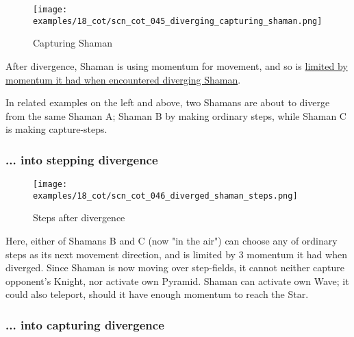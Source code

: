 \noindent
\begin{wrapfigure}[11]{l}{0.4\textwidth}
\centering
\texttt{[image: examples/18\_cot/scn\_cot\_045\_diverging\_capturing\_shaman.png]}
\vspace*{-0.4\baselineskip}
\caption{Capturing Shaman}
\label{fig:scn_cot_045_diverging_capturing_shaman}
\end{wrapfigure}
After divergence, Shaman is using momentum for movement, and so is
\hyperref[fig:scn_cot_031_own_shaman_is_divergent_end]{limited by momentum it had when encountered diverging Shaman}.

In related examples on the left and above, two Shamans are about to diverge from the
same Shaman A; Shaman B by making ordinary steps, while Shaman C is making capture-steps.

\clearpage %

\subsubsection*{... into stepping divergence}
\label{sec:Conquest of Tlalocan/Divergence/... into stepping divergence}

\vspace*{-1.4\baselineskip}
\noindent
\begin{figure}[!h]
\texttt{[image: examples/18\_cot/scn\_cot\_046\_diverged\_shaman\_steps.png]}
\vspace*{-1.4\baselineskip}
\caption{Steps after divergence}
\label{fig:scn_cot_046_diverged_shaman_steps}
\end{figure}

\vspace*{-0.4\baselineskip}
Here, either of Shamans B and C (now "in the air") can choose any of ordinary steps
as its next movement direction, and is limited by 3 momentum it had when diverged. \newline
\indent
Since Shaman is now moving over step-fields, it cannot neither capture opponent's
Knight, nor activate own Pyramid. Shaman can activate own Wave; it could also
teleport, should it have enough momentum to reach the Star.

\clearpage %

\subsubsection*{... into capturing divergence}
\label{sec:Conquest of Tlalocan/Divergence/... into capturing divergence}

